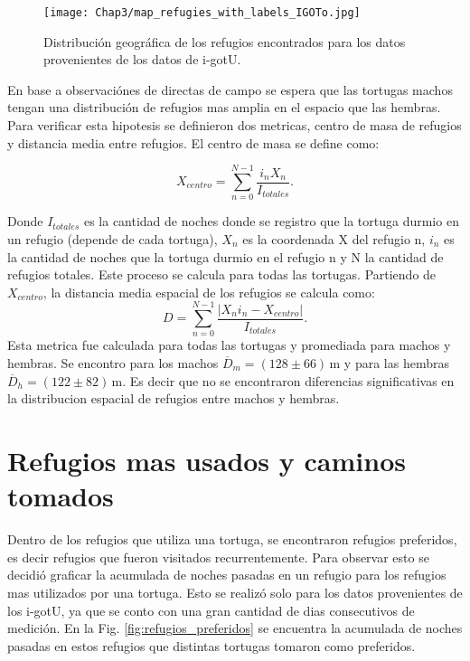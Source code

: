 \begin{figure}[ht]
    \begin{center}
        \texttt{[image: Chap3/map\_refugies\_with\_labels\_IGOTo.jpg]}
        \caption{Distribución geográfica de los refugios encontrados para los datos provenientes de los datos de i-gotU.} 
        \label{fig:refus_igotu_labels}
        
        \end{center}
\end{figure} 

En base a observaciónes de directas de campo \cite{Erika} se espera que las tortugas machos tengan una distribución de refugios mas amplia en el espacio que las hembras.  Para verificar esta hipotesis se definieron dos metricas, centro de masa de refugios y distancia media entre refugios. El centro de masa se define como:
\begin{center}
    

$$X_{centro}= \sum^{N -1}_{n=0} \frac{i_{n} X_n}{I_{totales}}.$$
\end{center}
Donde $I_{totales}$ es la cantidad de noches donde se registro que la tortuga durmio en un refugio (depende de cada tortuga), $X_n$ es la coordenada X del refugio n, $i_{n}$ es la cantidad de noches que la tortuga durmio en el refugio n y N la cantidad de refugios totales.  Este proceso se calcula para todas las tortugas. 
Partiendo de $X_{centro}$, la distancia media  espacial de los refugios se calcula como:
$$D = \sum^{N -1}_{n=0} \frac{|X_n i_n - X_{centro}|}{I_{totales}}.$$
\label{eq:distancia_media_refugios}
Esta metrica fue calculada para todas las tortugas y  promediada para  machos y hembras. Se encontro para los machos $\overline{D}_m =  (128\pm66)\,\text{m}$ y para las hembras     $\overline{D}_h = (122\pm82)\,\text{m}$. Es decir que no se encontraron diferencias significativas en la distribucion espacial de refugios  entre machos y hembras.
\section{Refugios mas usados y caminos tomados}
Dentro de los refugios que utiliza una tortuga, se encontraron refugios preferidos, es decir refugios que fueron visitados recurrentemente. Para observar esto se decidió graficar la acumulada de noches pasadas en un refugio para los refugios mas utilizados por una tortuga. Esto se realizó solo para los datos provenientes de los i-gotU, ya que se conto con una gran cantidad de dias consecutivos de medición. En la Fig. \ref{fig:refugios_preferidos} se encuentra la acumulada de noches pasadas en estos refugios que distintas tortugas tomaron como preferidos. 

